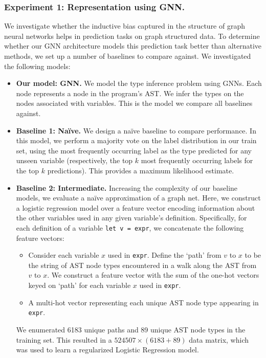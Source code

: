 \subsubsection{Experiment 1: Representation using GNN.}
We investigate whether the inductive bias captured in the structure of graph neural networks helps in prediction tasks on graph structured data.
To determine whether our GNN architecture models this prediction task better than alternative methods, we set up a number of baselines to compare against.
We investigated the following models:
\begin{itemize}[noitemsep,topsep=0pt]
\item \textbf{Our model: GNN.}
  We model the type inference problem using GNNs.
  Each node represents a node in the program's AST.
  We infer the types on the nodes associated with variables.
  This is the model we compare all baselines against.
\item \textbf{Baseline 1: Na\"ive.}
  We design a na\"ive baseline to compare performance.
  In this model, we perform a majority vote on the label distribution in our train set, using the most frequently occurring label as the type predicted for any unseen variable (respectively, the top $k$ most frequently occurring labels for the top $k$ predictions).
  This provides a maximum likelihood estimate.
\item \textbf{Baseline 2: Intermediate.}
  Increasing the complexity of our baseline models, we evaluate a na\"ive approximation of a graph net.
  Here, we construct a logistic regression model over a feature vector encoding information about the other variables used in any given variable's definition.
  Specifically, for each definition of a variable \mbox{\lstinline{let v = expr}}, we concatenate the following feature vectors:
  \begin{itemize}[noitemsep,topsep=0pt]
  \item Consider each variable $x$ used in \texttt{expr}.
    Define the `path' from $v$ to $x$ to be the string of AST node types encountered in a walk along the AST from $v$ to $x$.
    We construct a feature vector with the sum of the one-hot vectors keyed on `path' for each variable $x$ used in \texttt{expr}.
  \item A multi-hot vector representing each unique AST node type appearing in \texttt{expr}.
  \end{itemize}
  We enumerated 6183 unique paths and 89 unique AST node types in the training set.
  This resulted in a $524507 \times (6183+89)$ data matrix, which was used to learn a regularized Logistic Regression model.

\end{itemize}
